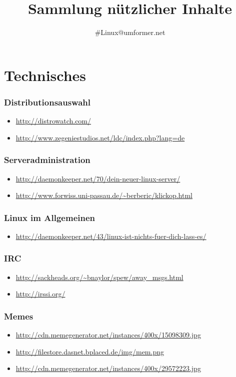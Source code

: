 \documentclass[oneside,12pt,a4paper]{scrartcl}
\title{Sammlung nützlicher Inhalte}
\author{\#Linux@umformer.net}
\newcommand{\linkitem}[1]{\item \url{#1}}
\begin{document}
\maketitle

\tableofcontents
\clearpage

\part{Technisches}
\section{Distributionsauswahl}
\begin{itemize}
\linkitem{http://distrowatch.com/}
\linkitem{http://www.zegeniestudios.net/ldc/index.php?lang=de}
\end{itemize}


\section{Serveradministration}
\begin{itemize}
\linkitem{http://daemonkeeper.net/70/dein-neuer-linux-server/}
\linkitem{http://www.forwiss.uni-passau.de/~berberic/klickop.html}
\end{itemize}

\section{Linux im Allgemeinen}
\begin{itemize}
\linkitem{http://daemonkeeper.net/43/linux-ist-nichts-fuer-dich-lass-es/}
\end{itemize}

\section{IRC}
\begin{itemize}
\linkitem{http://sackheads.org/~bnaylor/spew/away_msgs.html}
\linkitem{http://irssi.org/}
\end{itemize}

\section{Memes}
\begin{itemize}
\linkitem{http://cdn.memegenerator.net/instances/400x/15098309.jpg}
\linkitem{http://filestore.dasnet.bplaced.de/img/mem.png}
\linkitem{http://cdn.memegenerator.net/instances/400x/29572223.jpg}
\end{itemize}
\end{document}
